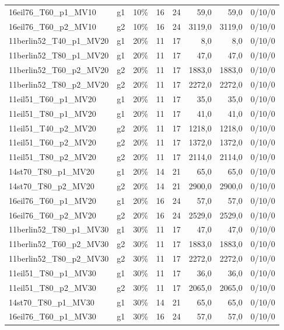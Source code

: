 \begin{longtable}{llrrrrrr}
16eil76\_T60\_p1\_MV10 & g1 & 10\% & 16 & 24 & 59{,}0 & 59{,}0 & 0/10/0 \\
16eil76\_T60\_p2\_MV10 & g2 & 10\% & 16 & 24 & 3119{,}0 & 3119{,}0 & 0/10/0 \\
11berlin52\_T40\_p1\_MV20 & g1 & 20\% & 11 & 17 & 8{,}0 & 8{,}0 & 0/10/0 \\
11berlin52\_T80\_p1\_MV20 & g1 & 20\% & 11 & 17 & 47{,}0 & 47{,}0 & 0/10/0 \\
11berlin52\_T60\_p2\_MV20 & g2 & 20\% & 11 & 17 & 1883{,}0 & 1883{,}0 & 0/10/0 \\
11berlin52\_T80\_p2\_MV20 & g2 & 20\% & 11 & 17 & 2272{,}0 & 2272{,}0 & 0/10/0 \\
11eil51\_T60\_p1\_MV20 & g1 & 20\% & 11 & 17 & 35{,}0 & 35{,}0 & 0/10/0 \\
11eil51\_T80\_p1\_MV20 & g1 & 20\% & 11 & 17 & 41{,}0 & 41{,}0 & 0/10/0 \\
11eil51\_T40\_p2\_MV20 & g2 & 20\% & 11 & 17 & 1218{,}0 & 1218{,}0 & 0/10/0 \\
11eil51\_T60\_p2\_MV20 & g2 & 20\% & 11 & 17 & 1372{,}0 & 1372{,}0 & 0/10/0 \\
11eil51\_T80\_p2\_MV20 & g2 & 20\% & 11 & 17 & 2114{,}0 & 2114{,}0 & 0/10/0 \\
14st70\_T80\_p1\_MV20 & g1 & 20\% & 14 & 21 & 65{,}0 & 65{,}0 & 0/10/0 \\
14st70\_T80\_p2\_MV20 & g2 & 20\% & 14 & 21 & 2900{,}0 & 2900{,}0 & 0/10/0 \\
16eil76\_T60\_p1\_MV20 & g1 & 20\% & 16 & 24 & 57{,}0 & 57{,}0 & 0/10/0 \\
16eil76\_T60\_p2\_MV20 & g2 & 20\% & 16 & 24 & 2529{,}0 & 2529{,}0 & 0/10/0 \\
11berlin52\_T80\_p1\_MV30 & g1 & 30\% & 11 & 17 & 47{,}0 & 47{,}0 & 0/10/0 \\
11berlin52\_T60\_p2\_MV30 & g2 & 30\% & 11 & 17 & 1883{,}0 & 1883{,}0 & 0/10/0 \\
11berlin52\_T80\_p2\_MV30 & g2 & 30\% & 11 & 17 & 2272{,}0 & 2272{,}0 & 0/10/0 \\
11eil51\_T80\_p1\_MV30 & g1 & 30\% & 11 & 17 & 36{,}0 & 36{,}0 & 0/10/0 \\
11eil51\_T80\_p2\_MV30 & g2 & 30\% & 11 & 17 & 2065{,}0 & 2065{,}0 & 0/10/0 \\
14st70\_T80\_p1\_MV30 & g1 & 30\% & 14 & 21 & 65{,}0 & 65{,}0 & 0/10/0 \\
16eil76\_T60\_p1\_MV30 & g1 & 30\% & 16 & 24 & 57{,}0 & 57{,}0 & 0/10/0 \\
\end{longtable}
\normalsize

